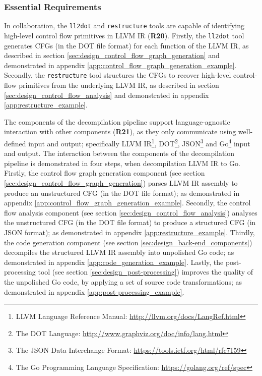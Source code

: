 
\subsubsection{Essential Requirements}
\label{sec:eval_control_flow_analysis_tool_essential_requirements}


In collaboration, the \texttt{ll2dot} and \texttt{restructure} tools are capable of identifying high-level control flow primitives in LLVM IR (\textbf{R20}). Firstly, the \texttt{ll2dot} tool generates CFGs (in the DOT file format) for each function of the LLVM IR, as described in section \ref{sec:design_control_flow_graph_generation} and demonstrated in appendix \ref{app:control_flow_graph_generation_example}. Secondly, the \texttt{restructure} tool structures the CFGs to recover high-level control-flow primitives from the underlying LLVM IR, as described in section \ref{sec:design_control_flow_analysis} and demonstrated in appendix \ref{app:restructure_example}.


The components of the decompilation pipeline support language-agnostic interaction with other components (\textbf{R21}), as they only communicate using well-defined input and output; specifically LLVM IR\footnote{LLVM Language Reference Manual: \url{http://llvm.org/docs/LangRef.html}}, DOT\footnote{The DOT Language: \url{http://www.graphviz.org/doc/info/lang.html}}, JSON\footnote{The JSON Data Interchange Format: \url{https://tools.ietf.org/html/rfc7159}} and Go\footnote{The Go Programming Language Specification: \url{https://golang.org/ref/spec}} input and output. The interaction between the components of the decompilation pipeline is demonstrated in four steps, when decompilation LLVM IR to Go. Firstly, the control flow graph generation component (see section \ref{sec:design_control_flow_graph_generation}) parses LLVM IR assembly to produce an unstructured CFG (in the DOT file format); as demonstrated in appendix \ref{app:control_flow_graph_generation_example}. Secondly, the control flow analysis component (see section \ref{sec:design_control_flow_analysis}) analyses the unstructured CFG (in the DOT file format) to produce a structured CFG (in JSON format); as demonstrated in appendix \ref{app:restructure_example}. Thirdly, the code generation component (see section \ref{sec:design_back-end_components}) decompiles the structured LLVM IR assembly into unpolished Go code; as demonstrated in appendix \ref{app:code_generation_example}. Lastly, the post-processing tool (see section \ref{sec:design_post-processing}) improves the quality of the unpolished Go code, by applying a set of source code transformations; as demonstrated in appendix \ref{app:post-processing_example}.
